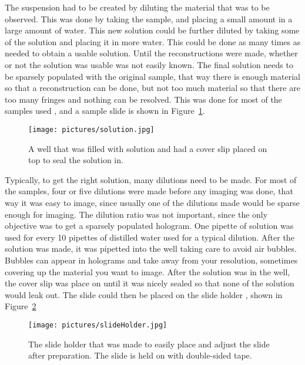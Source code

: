 The suspension had to be created by diluting the material that was to be
observed. This was done by taking the sample, and placing a small amount in a
large amount of water. This new solution could be further diluted by taking
some of the solution and placing it in more water. This could be done as many
times as needed to obtain a usable solution. Until the reconstructions were
made, whether or not the solution was usable was not easily known.  The final solution needs to be
sparsely populated with the original sample, that way there is enough material
so that a reconstruction can be done, but not too much material so that there
are too many fringes and nothing can be resolved. This was done for most of the
samples used%
, and a sample slide is shown in Figure~\ref{fig:solutionSlide}.

\begin{figure}[htbp!]
\begin{center}
    \texttt{[image: pictures/solution.jpg]}
\end{center}
\caption{A well that was filled with solution and had a cover slip placed on
top to seal the solution in.}
\label{fig:solutionSlide}
\end{figure}

Typically, to get the right solution, many dilutions need to be made. For most
of the samples, four or five dilutions were made before any imaging was done,
that way it was easy to image, since usually one of the dilutions made would be
sparse enough for imaging. The dilution ratio was not important, since the only
objective was to get a sparsely populated hologram. One pipette of solution was
used for every 10 pipettes of distilled water used for a typical dilution.
After the solution was made, it was pipetted into the well taking care to
avoid air bubbles. Bubbles can appear in holograms and take away from your
resolution, sometimes covering up the material you want to image. After the
solution was in the well, the cover slip was place on until it was nicely
sealed so that none of the solution would leak out. The slide could then be
placed on the slide holder%
, shown in Figure~\ref{fig:slideHolder}

\begin{figure}[htbp!]
\begin{center}
    \texttt{[image: pictures/slideHolder.jpg]}
\end{center}
\caption{The slide holder that was made to easily place and adjust the slide
after preparation. The slide is held on with double-sided tape.}
\label{fig:slideHolder}
\end{figure}


